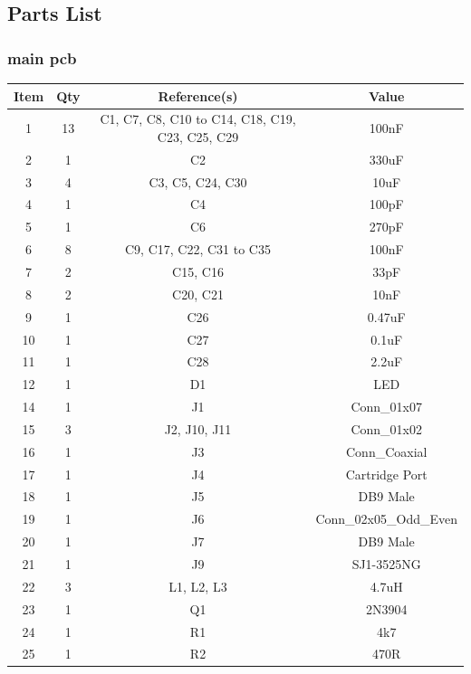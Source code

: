 \subsection{Parts List}

\subsubsection{main pcb}
\begin{footnotesize}
\begin{longtable}{ |*{4}{c|} }
\hline
{Item} & {Qty} & {Reference(s)} & {Value} \\
\hline
{1} & {13} & {C1, C7, C8, C10 to C14, C18, C19, C23, C25, C29} & {100nF} \\
\hline
{2} & {1} & {C2} & {330uF} \\
\hline
{3} & {4} & {C3, C5, C24, C30} & {10uF} \\
\hline
{4} & {1} & {C4} & {100pF} \\
\hline
{5} & {1} & {C6} & {270pF} \\
\hline
{6} & {8} & {C9, C17, C22, C31 to C35} & {100nF} \\
\hline
{7} & {2} & {C15, C16} & {33pF} \\
\hline
{8} & {2} & {C20, C21} & {10nF} \\
\hline
{9} & {1} & {C26} & {0.47uF} \\
\hline
{10} & {1} & {C27} & {0.1uF} \\
\hline
{11} & {1} & {C28} & {2.2uF} \\
\hline
{12} & {1} & {D1} & {LED} \\
\hline
{14} & {1} & {J1} & {Conn\_01x07} \\
\hline
{15} & {3} & {J2, J10, J11} & {Conn\_01x02} \\
\hline
{16} & {1} & {J3} & {Conn\_Coaxial} \\
\hline
{17} & {1} & {J4} & {Cartridge Port} \\
\hline
{18} & {1} & {J5} & {DB9 Male} \\
\hline
{19} & {1} & {J6} & {Conn\_02x05\_Odd\_Even} \\
\hline
{20} & {1} & {J7} & {DB9 Male} \\
\hline
{21} & {1} & {J9} & {SJ1-3525NG} \\
\hline
{22} & {3} & {L1, L2, L3} & {4.7uH} \\
\hline
{23} & {1} & {Q1} & {2N3904} \\
\hline
{24} & {1} & {R1} & {4k7} \\
\hline
{25} & {1} & {R2} & {470R} \\

\end{longtable}
\end{footnotesize}
